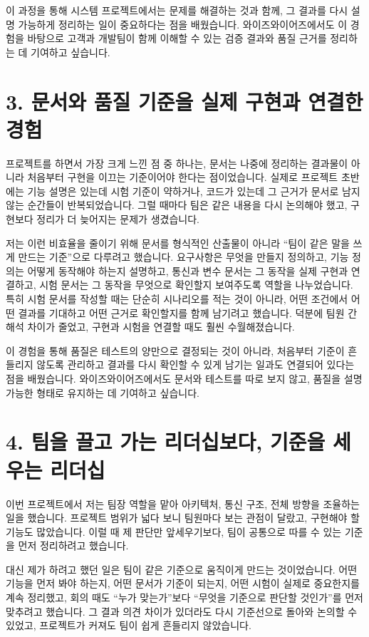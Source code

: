 \documentclass[11pt]{article}
\begin{document}
이 과정을 통해 시스템 프로젝트에서는 문제를 해결하는 것과 함께, 그 결과를 다시 설명 가능하게 정리하는 일이 중요하다는 점을 배웠습니다. 와이즈와이어즈에서도 이 경험을 바탕으로 고객과 개발팀이 함께 이해할 수 있는 검증 결과와 품질 근거를 정리하는 데 기여하고 싶습니다.

\section*{3. 문서와 품질 기준을 실제 구현과 연결한 경험}
프로젝트를 하면서 가장 크게 느낀 점 중 하나는, 문서는 나중에 정리하는 결과물이 아니라 처음부터 구현을 이끄는 기준이어야 한다는 점이었습니다. 실제로 프로젝트 초반에는 기능 설명은 있는데 시험 기준이 약하거나, 코드가 있는데 그 근거가 문서로 남지 않는 순간들이 반복되었습니다. 그럴 때마다 팀은 같은 내용을 다시 논의해야 했고, 구현보다 정리가 더 늦어지는 문제가 생겼습니다.

저는 이런 비효율을 줄이기 위해 문서를 형식적인 산출물이 아니라 ``팀이 같은 말을 쓰게 만드는 기준''으로 다루려고 했습니다. 요구사항은 무엇을 만들지 정의하고, 기능 정의는 어떻게 동작해야 하는지 설명하고, 통신과 변수 문서는 그 동작을 실제 구현과 연결하고, 시험 문서는 그 동작을 무엇으로 확인할지 보여주도록 역할을 나누었습니다. 특히 시험 문서를 작성할 때는 단순히 시나리오를 적는 것이 아니라, 어떤 조건에서 어떤 결과를 기대하고 어떤 근거로 확인할지를 함께 남기려고 했습니다. 덕분에 팀원 간 해석 차이가 줄었고, 구현과 시험을 연결할 때도 훨씬 수월해졌습니다.

이 경험을 통해 품질은 테스트의 양만으로 결정되는 것이 아니라, 처음부터 기준이 흔들리지 않도록 관리하고 결과를 다시 확인할 수 있게 남기는 일과도 연결되어 있다는 점을 배웠습니다. 와이즈와이어즈에서도 문서와 테스트를 따로 보지 않고, 품질을 설명 가능한 형태로 유지하는 데 기여하고 싶습니다.

\section*{4. 팀을 끌고 가는 리더십보다, 기준을 세우는 리더십}
이번 프로젝트에서 저는 팀장 역할을 맡아 아키텍처, 통신 구조, 전체 방향을 조율하는 일을 했습니다. 프로젝트 범위가 넓다 보니 팀원마다 보는 관점이 달랐고, 구현해야 할 기능도 많았습니다. 이럴 때 제 판단만 앞세우기보다, 팀이 공통으로 따를 수 있는 기준을 먼저 정리하려고 했습니다.

대신 제가 하려고 했던 일은 팀이 같은 기준으로 움직이게 만드는 것이었습니다. 어떤 기능을 먼저 봐야 하는지, 어떤 문서가 기준이 되는지, 어떤 시험이 실제로 중요한지를 계속 정리했고, 회의 때도 ``누가 맞는가''보다 ``무엇을 기준으로 판단할 것인가''를 먼저 맞추려고 했습니다. 그 결과 의견 차이가 있더라도 다시 기준선으로 돌아와 논의할 수 있었고, 프로젝트가 커져도 팀이 쉽게 흔들리지 않았습니다.
\end{document}
